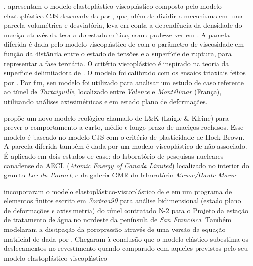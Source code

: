 \textbf{}, apresentam o modelo elastoplástico-viscoplástico composto pelo modelo elastoplástico CJS desenvolvido por , que, além de dividir o mecanismo em uma parcela volumétrica e desviatória, leva em conta a dependência da densidade do maciço através da teoria do estado crítico, como pode-se ver em . A parcela diferida é dada pelo modelo viscoplástico de  com o parâmetro de viscosidade em função da distância entre o estado de tensões e a superfície de ruptura, para representar a fase terciária. O critério viscoplástico é inspirado na teoria da superfície delimitadora de . O modelo foi calibrado com os ensaios triaxiais feitos por . Por fim, seu modelo foi utilizado para analisar um estudo de caso referente ao túnel de \textit{Tartaiguille}, localizado entre \textit{Valence} e \textit{Montélimar} (França), utilizando análises axissimétricas e em estado plano de deformações.

\textbf{} propõe um novo modelo reológico chamado de L\&K (Laigle \& Kleine) para prever o comportamento a curto, médio e longo prazo de maciços rochosos. Esse modelo é baseado no modelo CJS com o critério de plasticidade de Hoek-Brown. A parcela diferida também é dada por um modelo viscoplástico de  não associado. É aplicado em dois estudos de caso: do laboratório de pesquisas nucleares canadense da AECL (\textit{Atomic Energy of Canada Limited}) localizado no interior do granito \textit{Lac du Bonnet}, e da galeria GMR do laboratório \textit{Meuse/Haute-Marne}.

\textbf{} incorporaram o modelo elastoplástico-viscoplástico de  e  em um programa de elementos finitos escrito em \textit{Fortran90} para análise bidimensional (estado plano de deformações e axissimetria) do túnel contratado N-2 para o Projeto da estação de tratamento de água no nordeste da península de \textit{San Francisco}. Também modelaram a dissipação da poropressão através de uma versão da equação matricial de  dada por . Chegaram à conclusão que o modelo elástico subestima os deslocamentos no revestimento quando comparado com aqueles previstos pelo seu modelo elastoplástico-viscoplástico.

